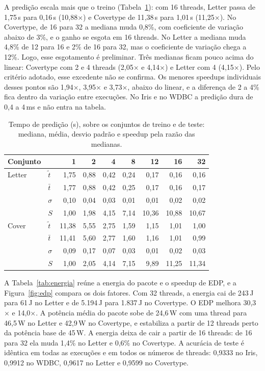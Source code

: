 \documentclass[12pt]{article}
\begin{document}
A predição escala mais que o treino (Tabela~\ref{tab:pred}): com 16 threads, Letter
passa de 1{,}75\,s para 0{,}16\,s (10{,}88$\times$) e Covertype de 11{,}38\,s para
1{,}01\,s (11{,}25$\times$). No Covertype, de 16 para 32 a mediana muda 0{,}8\%, com
coeficiente de variação abaixo de 3\%, e o ganho se esgota em 16 threads. No
Letter a mediana muda 4{,}8\% de 12 para 16 e 2\% de 16 para 32, mas o coeficiente
de variação chega a 12\%. Logo, esse esgotamento é preliminar. Três medianas ficam pouco acima do linear: Covertype com 2 e 4 threads
(2{,}05$\times$ e 4{,}14$\times$) e Letter com 4 (4{,}15$\times$). Pelo critério
adotado, esse excedente não se confirma. Os menores speedups individuais desses
pontos são 1{,}94$\times$, 3{,}95$\times$ e 3{,}73$\times$, abaixo do linear, e a
diferença de 2 a 4\% fica dentro da variação entre execuções. No Iris e no WDBC a
predição dura de 0{,}4 a 4\,ms e não entra na tabela.

\begin{table}[!htbp]
\centering
\caption{Tempo de predição (s), sobre os conjuntos de treino e de teste: mediana,
média, desvio padrão e speedup pela razão das medianas.}
\label{tab:pred}
\footnotesize
\setlength{\tabcolsep}{4.2pt}
\begin{tabular}{@{}llrrrrrrr@{}}
\toprule
Conjunto & & 1 & 2 & 4 & 8 & 12 & 16 & 32 \\
\midrule
Letter & $\tilde{t}$ & 1{,}75 & 0{,}88 & 0{,}42 & 0{,}24 & 0{,}17 & 0{,}16 & 0{,}16 \\
       & $\bar{t}$ & 1{,}77 & 0{,}88 & 0{,}42 & 0{,}25 & 0{,}17 & 0{,}16 & 0{,}17 \\
       & $\sigma$ & 0{,}10 & 0{,}04 & 0{,}03 & 0{,}01 & 0{,}01 & 0{,}02 & 0{,}02 \\
       & $S$ & 1{,}00 & 1{,}98 & 4{,}15 & 7{,}14 & 10{,}36 & 10{,}88 & 10{,}67 \\
\addlinespace
Cover & $\tilde{t}$ & 11{,}38 & 5{,}55 & 2{,}75 & 1{,}59 & 1{,}15 & 1{,}01 & 1{,}00 \\
       & $\bar{t}$ & 11{,}41 & 5{,}60 & 2{,}77 & 1{,}60 & 1{,}16 & 1{,}01 & 0{,}99 \\
       & $\sigma$ & 0{,}09 & 0{,}17 & 0{,}07 & 0{,}03 & 0{,}01 & 0{,}02 & 0{,}03 \\
       & $S$ & 1{,}00 & 2{,}05 & 4{,}14 & 7{,}15 & 9{,}89 & 11{,}25 & 11{,}34 \\
\bottomrule
\end{tabular}
\end{table}

A Tabela~\ref{tab:energia} reúne a energia do pacote e o speedup de EDP, e a
Figura~\ref{fig:edp} compara os dois fatores. Com 32 threads, a energia cai de
243\,J para 61\,J no Letter e de 5{.}194\,J para 1{.}837\,J no Covertype. O EDP
melhora 30{,}3$\times$ e 14{,}0$\times$. A potência média do pacote sobe de
24{,}6\,W com uma thread para 46{,}5\,W no Letter e 42{,}9\,W no Covertype, e
estabiliza a partir de 12 threads perto da potência base de 45\,W. A energia deixa
de cair a partir de 16 threads: de 16 para 32 ela muda 1{,}4\% no Letter e 0{,}6\%
no Covertype. A acurácia de teste é idêntica em todas as execuções e em todos os
números de threads: 0{,}9333 no Iris, 0{,}9912 no WDBC, 0{,}9617 no Letter e
0{,}9599 no Covertype.
\end{document}
